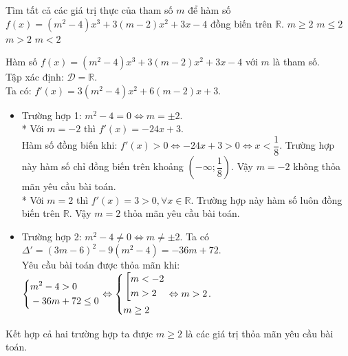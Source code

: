 \begin{ex}%
 Tìm tất cả các giá trị thực của tham số $m$ để hàm số $f(x) = (m^2 - 4)x^3 + 3(m-2)x^2 + 3x -4$ đồng biến trên $\mathbb{R}$.
 \choice
  {\True $m \geq 2$}
  {$m \leq 2$}
  {$m > 2$}
  {$m < 2$}
 \loigiai
  {
  Hàm số $f(x) = (m^2 - 4)x^3 + 3(m-2)x^2 + 3x -4$ với $m$ là tham số.\\
  Tập xác định: $\mathscr{D} = \mathbb{R}$.\\
  Ta có: $f'(x) = 3(m^2 - 4)x^2 + 6(m - 2)x + 3$.
  \begin{itemize}
   \item Trường hợp 1: $m^2 - 4 = 0 \Leftrightarrow m = \pm 2$.\\
   * Với $m = -2$ thì $f'(x) = -24x + 3$.\\
   Hàm số đồng biến khi: $f'(x) > 0 \Leftrightarrow -24x + 3 > 0 \Leftrightarrow x < \dfrac{1}{8}$. Trường hợp này hàm số chỉ đồng biến trên khoảng $\left(-\infty; \dfrac{1}{8}\right)$. Vậy $m = -2$ không thỏa mãn yêu cầu bài toán.\\
   * Với $m = 2$ thì $f'(x) = 3 >0, \forall x \in \mathbb{R}$. Trường hợp này hàm số luôn đồng biến trên  $\mathbb{R}$. Vậy $m = 2$ thỏa mãn yêu cầu bài toán.
   \item Trường hợp 2: $m^2 - 4 \neq 0 \Leftrightarrow m \neq \pm 2$.
   Ta có $\Delta' = (3m-6)^2 - 9(m^2 - 4) = -36m + 72$.\\
   Yêu cầu bài toán được thỏa mãn khi: $\left\{\begin{aligned}& m^2 - 4 > 0 \\& -36m + 72 \leq 0\end{aligned}\right. \Leftrightarrow \left\{\begin{aligned}& \left[\begin{aligned}&m < -2 \\& m > 2\end{aligned}\right. \\& m \geq 2\end{aligned}\right. \Leftrightarrow m > 2$.
  \end{itemize}
  Kết hợp cả hai trường hợp ta được $m \geq 2$ là các giá trị thỏa mãn yêu cầu bài toán.
  }
\end{ex}


